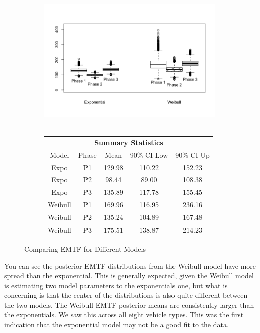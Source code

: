\documentclass[12pt]{article}
\begin{document}
\begin{figure}[h!]
\centering
\begin{subfigure}{.5\textwidth}
  \centering
      \includegraphics[width=9cm, height=7cm]{Boxplots}
\end{subfigure}%
\begin{subfigure}{.5\textwidth}
  \center
  \begin{tabular}{|c|c|c|c|c|}
  \multicolumn{5}{c}{\textbf{Summary Statistics}} \\
  \cline{1-5}
  Model & Phase & Mean & 90\% CI Low & 90\% CI Up \\
  \hline
  Expo & P1   & 129.98   & 110.22 &  152.23 \\
  Expo & P2   & 98.44  & 89.00 &  108.38  \\
  Expo & P3   & 135.89   & 117.78 &  155.45 \\
  Weibull & P1   & 169.96  & 116.95 & 236.16 \\
  Weibull & P2   & 135.24   & 104.89 & 167.48 \\
  Weibull & P3   & 175.51   & 138.87 & 214.23 \\
  \hline
  \end{tabular}
\end{subfigure}
\caption{Comparing EMTF for Different Models}
\label{fig:test}
\end{figure}

You can see the posterior EMTF distributions from the Weibull model have more
spread than the exponential.  This is generally expected, given the Weibull
model is estimating two model parameters to the exponentials one, but what is
concerning is that the center of the distributions is also quite different
between the two models.  The Weibull EMTF posterior means are consistently
larger than the exponentials.  We saw this across all eight vehicle types.  This
was the first indication that the exponential model may not be a good fit to the
data.
\end{document}
